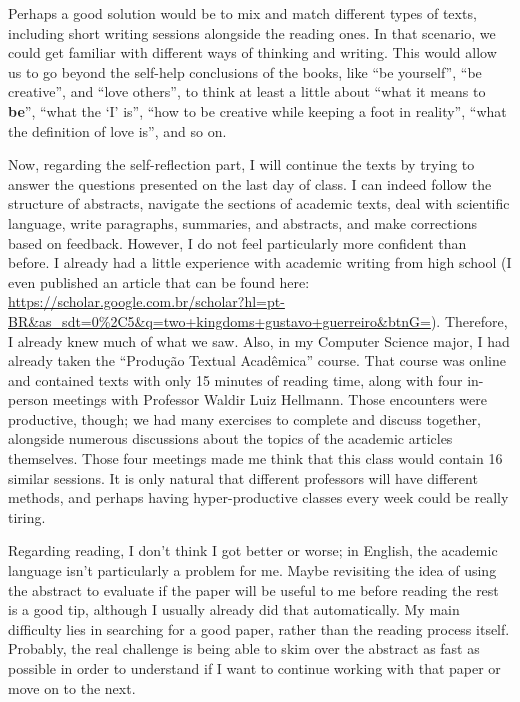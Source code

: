 Perhaps a good solution would be to mix and match different types of texts, including short writing sessions alongside the reading ones. In that scenario, we could get familiar with different ways of thinking and writing. This would allow us to go beyond the self-help conclusions of the books, like ``be yourself'', ``be creative'', and ``love others'', to think at least a little about ``what it means to \textbf{be}'', ``what the `I' is'', ``how to be creative while keeping a foot in reality'', ``what the definition of love is'', and so on.

Now, regarding the self-reflection part, I will continue the texts by trying to answer the questions presented on the last day of class. I can indeed follow the structure of abstracts, navigate the sections of academic texts, deal with scientific language, write paragraphs, summaries, and abstracts, and make corrections based on feedback. However, I do not feel particularly more confident than before. I already had a little experience with academic writing from high school (I even published an article that can be found here: \url{https://scholar.google.com.br/scholar?hl=pt-BR&as_sdt=0%2C5&q=two+kingdoms+gustavo+guerreiro&btnG=}). Therefore, I already knew much of what we saw. Also, in my Computer Science major, I had already taken the ``Produção Textual Acadêmica'' course. That course was online and contained texts with only 15 minutes of reading time, along with four in-person meetings with Professor Waldir Luiz Hellmann. Those encounters were productive, though; we had many exercises to complete and discuss together, alongside numerous discussions about the topics of the academic articles themselves. Those four meetings made me think that this class would contain 16 similar sessions. It is only natural that different professors will have different methods, and perhaps having hyper-productive classes every week could be really tiring.

Regarding reading, I don't think I got better or worse; in English, the academic language isn't particularly a problem for me. Maybe revisiting the idea of using the abstract to evaluate if the paper will be useful to me before reading the rest is a good tip, although I usually already did that automatically. My main difficulty lies in searching for a good paper, rather than the reading process itself. Probably, the real challenge is being able to skim over the abstract as fast as possible in order to understand if I want to continue working with that paper or move on to the next.

